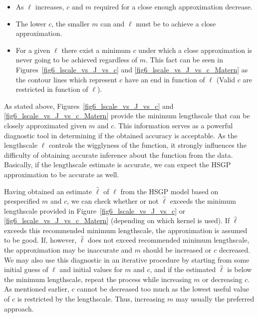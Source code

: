 \documentclass[onecolumn,a4paper,11pt]{article}
\begin{document}
\begin{itemize}
\item As $\ell$ increases, $c$ and $m$ required for a close enough approximation decrease.
\item The lower $c$, the smaller $m$ can and $\ell$ must be to achieve a close approximation.
\item For a given $\ell$ there exist a minimum $c$ under which a close approximation is never going to be achieved regardless of $m$. This fact can be seen in Figures~\ref{fig6_lscale_vs_J_vs_c} and \ref{fig6_lscale_vs_J_vs_c_Matern} as the contour lines which represent $c$ have an end in function of $\ell$ (Valid $c$ are restricted in function of $\ell$).
\end{itemize}

As stated above, Figures~\ref{fig6_lscale_vs_J_vs_c} and \ref{fig6_lscale_vs_J_vs_c_Matern} provide the minimum lengthscale that can be closely approximated given $m$ and $c$. This information serves as a powerful diagnostic tool in determining if the obtained accuracy is acceptable. As the lengthscale $\ell$ controls the wigglyness of the function, it strongly influences the difficulty of obtaining accurate inference about the function from the data. Basically, if the lengthscale estimate is accurate, we can expect the HSGP approximation to be accurate as well.

Having obtained an estimate $\hat{\ell}$ of $\ell$ from the HSGP model based on prespecified $m$ and $c$, we can check whether or not $\hat{\ell}$ exceeds the minimum lengthscale provided in Figure~\ref{fig6_lscale_vs_J_vs_c} or \ref{fig6_lscale_vs_J_vs_c_Matern} (depending on which kernel is used). If $\hat{\ell}$ exceeds this recommended minimum lengthscale, the approximation is assumed to be good. If, however, $\hat{\ell}$ does not exceed recommended minimum lengthscale, the approximation may be inaccurate and $m$ should be increased or $c$ decreased. We may also use this diagnostic in an iterative procedure by starting from some initial guess of $\ell$ and initial values for $m$ and $c$, and if the estimated $\hat{\ell}$ is below the minimum lengthscale, repeat the process while increasing $m$ or decreasing $c$. As mentioned earlier, $c$ cannot be decreased too much as the lowest useful value of $c$ is restricted by the lengthscale. Thus, increasing $m$ may usually the preferred approach.
\end{document}
